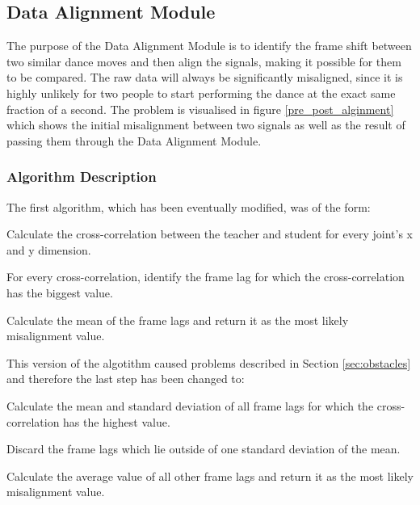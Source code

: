 \documentclass[11pt,a4paper]{article}
\begin{document}
\clearpage
\subsection{Data Alignment Module}
\noindent
The purpose of the Data Alignment Module is to identify the frame shift between two similar dance moves and then align the signals, making it possible for them to be compared. The raw data will always be significantly misaligned, since it is highly unlikely for two people to start performing the dance at the exact same fraction of a second. The problem is visualised in figure \ref{pre_post_alginment} which shows the initial misalignment between two signals as well as the result of passing them through the Data Alignment Module.

\subsubsection{Algorithm Description}
\noindent
The first algorithm, which has been eventually modified, was of the form:
\begin{compactitem}
\setlength{\itemsep}{1pt}
\setlength{\parskip}{0pt}
\setlength{\parsep}{0pt}
	\item Calculate the cross-correlation between the teacher and student for every joint's x and y dimension.
	\item For every cross-correlation, identify the frame lag for which the cross-correlation has the biggest value.
	\item Calculate the mean of the frame lags and return it as the most likely misalignment value.
\end{compactitem}
This version of the algotithm caused problems described in Section \ref{sec:obstacles} and therefore the last step has been changed to:
\begin{compactitem}
\setlength{\itemsep}{1pt}
\setlength{\parskip}{0pt}
\setlength{\parsep}{0pt}
	\item Calculate the mean and standard deviation of all frame lags for which the cross-correlation has the highest value.
	\item Discard the frame lags which lie outside of one standard deviation of the mean.
	\item Calculate the average value of all other frame lags and return it as the most likely misalignment value.
\end{compactitem}
\end{document}
